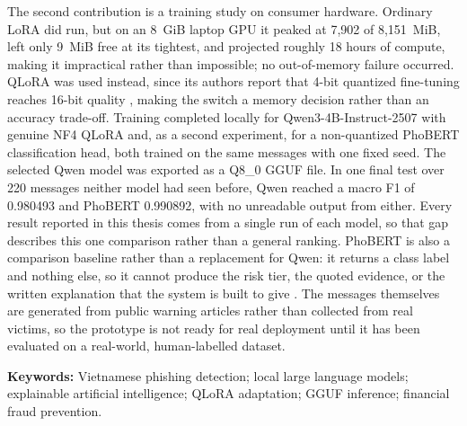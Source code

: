 The second contribution is a training study on consumer hardware. Ordinary LoRA \cite{hu2022lora} did run, but on an 8~GiB laptop GPU it peaked at 7{,}902 of 8{,}151~MiB, left only 9~MiB free at its tightest, and projected roughly 18 hours of compute, making it impractical rather than impossible; no out-of-memory failure occurred. QLoRA was used instead, since its authors report that 4-bit quantized fine-tuning reaches 16-bit quality \cite{dettmers2023qlora}, making the switch a memory decision rather than an accuracy trade-off. Training completed locally for Qwen3-4B-Instruct-2507 with genuine NF4 QLoRA and, as a second experiment, for a non-quantized PhoBERT classification head, both trained on the same messages with one fixed seed. The selected Qwen model was exported as a Q8\_0 GGUF file. In one final test over 220 messages neither model had seen before, Qwen reached a macro F1 of 0.980493 and PhoBERT 0.990892, with no unreadable output from either. Every result reported in this thesis comes from a single run of each model, so that gap describes this one comparison rather than a general ranking. PhoBERT is also a comparison baseline rather than a replacement for Qwen: it returns a class label and nothing else, so it cannot produce the risk tier, the quoted evidence, or the written explanation that the system is built to give \cite{narang2020wt5}. The messages themselves are generated from public warning articles rather than collected from real victims, so the prototype is not ready for real deployment until it has been evaluated on a real-world, human-labelled dataset.

\vspace{0.5em}
\noindent\textbf{Keywords:} Vietnamese phishing detection; local large language models; explainable artificial intelligence; QLoRA adaptation; GGUF inference; financial fraud prevention.

\cleardoublepage
{}
